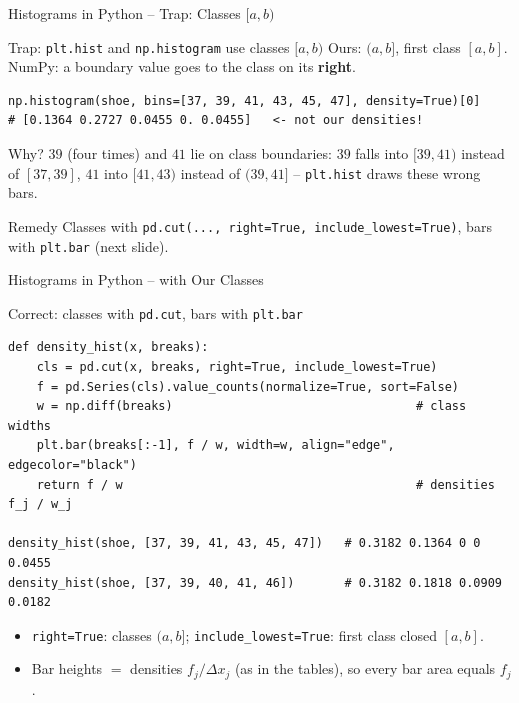 \documentclass[aspectratio=169,11pt]{beamer}
\begin{document}
\begin{frame}[fragile]{Histograms in Python -- Trap: Classes $[a,b)$}
  \lstset{aboveskip=2pt,belowskip=2pt}
  \begin{alertblock}{Trap: \texttt{plt.hist} and \texttt{np.histogram} use classes $[a,b)$}
    Ours: $(a,b]$, first class $[a,b]$. NumPy: a boundary value goes to the class on its \textbf{right}.
    \begin{lstlisting}
np.histogram(shoe, bins=[37, 39, 41, 43, 45, 47], density=True)[0]
# [0.1364 0.2727 0.0455 0. 0.0455]   <- not our densities!
    \end{lstlisting}
  \end{alertblock}
  \begin{block}{Why?}
    $39$ (four times) and $41$ lie on class boundaries: $39$ falls into $[39,41)$ instead of
    $[37,39]$, $41$ into $[41,43)$ instead of $(39,41]$ -- \texttt{plt.hist} draws these wrong bars.
  \end{block}
  \begin{block}{Remedy}
    Classes with \texttt{pd.cut(..., right=True, include\_lowest=True)}, bars with \texttt{plt.bar} (next slide).
  \end{block}
\end{frame}

\begin{frame}[fragile]{Histograms in Python -- with Our Classes}
  \begin{block}{Correct: classes with \texttt{pd.cut}, bars with \texttt{plt.bar}}
    \begin{lstlisting}
def density_hist(x, breaks):
    cls = pd.cut(x, breaks, right=True, include_lowest=True)
    f = pd.Series(cls).value_counts(normalize=True, sort=False)
    w = np.diff(breaks)                                  # class widths
    plt.bar(breaks[:-1], f / w, width=w, align="edge", edgecolor="black")
    return f / w                                         # densities f_j / w_j

density_hist(shoe, [37, 39, 41, 43, 45, 47])   # 0.3182 0.1364 0 0 0.0455
density_hist(shoe, [37, 39, 40, 41, 46])       # 0.3182 0.1818 0.0909 0.0182
    \end{lstlisting}
  \end{block}
  \begin{itemize}
    \item \texttt{right=True}: classes $(a,b]$; \texttt{include\_lowest=True}: first class closed $[a,b]$.
    \item Bar heights $=$ densities $f_j/\Delta x_j$ (as in the tables), so every bar
          area equals $f_j$.
  \end{itemize}
\end{frame}
\end{document}
